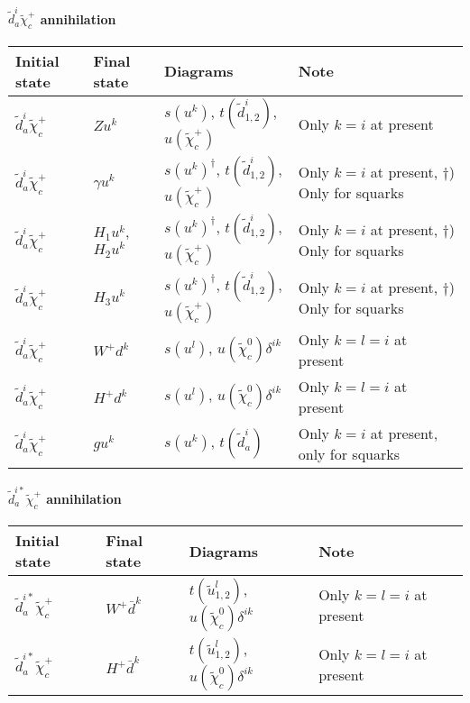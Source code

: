\paragraph{$\tilde{d}^{i}_{a} \tilde{\chi}_{c}^{+}$ annihilation}

\begin{center}
\begin{tabular}{llll} \hline
{\bfseries Initial state} & {\bfseries Final state} &
{\bfseries Diagrams} & {\bfseries Note} \\ \hline \tabspace
$\tilde{d}^{i}_a \tilde{\chi}_{c}^+$ & $Z u^k$ &
$s(u^k)$, $t(\tilde{d}^i_{1,2})$, $u(\tilde{\chi}_c^+)$
& Only $k=i$ at present \\
$\tilde{d}^{i}_a \tilde{\chi}_{c}^+$ & $\gamma u^k$ &
$s(u^k)^\dagger$, $t(\tilde{d}^i_{1,2})$, $u(\tilde{\chi}_c^+)$ 
& Only $k=i$ at present, $\dagger$) Only for squarks \\
$\tilde{d}^{i}_a \tilde{\chi}_{c}^+$ & $H_1 u^k$, $H_2 u^k$ &
$s(u^k)^\dagger$, $t(\tilde{d}^i_{1,2})$, $u(\tilde{\chi}_c^+)$ 
& Only $k=i$ at present, $\dagger$) Only for squarks \\
$\tilde{d}^{i}_a \tilde{\chi}_{c}^+$ & $H_3 u^k$ &
$s(u^k)^\dagger$, $t(\tilde{d}^i_{1,2})$, $u(\tilde{\chi}_c^+)$ 
& Only $k=i$ at present, $\dagger$) Only for squarks \\
$\tilde{d}^{i}_a \tilde{\chi}_{c}^+$ & $W^+ d^k$ &
$s(u^l)$, $u(\tilde{\chi}_c^0)\delta^{ik}$
& Only $k=l=i$ at present \\
$\tilde{d}^{i}_a \tilde{\chi}_{c}^+$ & $H^+ d^k$ &
$s(u^l)$, $u(\tilde{\chi}_c^0)\delta^{ik}$
& Only $k=l=i$ at present \\
$\tilde{d}^{i}_a \tilde{\chi}_{c}^+$ & $g u^k$ &
$s(u^k)$, $t(\tilde{d}_a^i)$
& Only $k=i$ at present, only for squarks \\ \hline
\end{tabular}
\end{center}

\paragraph{$\tilde{d}^{i*}_{a} \tilde{\chi}_{c}^{+}$ annihilation}

\begin{center}
\begin{tabular}{llll} \hline
{\bfseries Initial state} & {\bfseries Final state} &
{\bfseries Diagrams} & {\bfseries Note} \\ \hline \tabspace
$\tilde{d}^{i*}_a \tilde{\chi}_{c}^+$ & $W^+ \bar{d}^k$ &
$t(\tilde{u}^l_{1,2})$, $u(\tilde{\chi}_c^0)\delta^{ik}$ 
& Only $k=l=i$ at present \\
$\tilde{d}^{i*}_a \tilde{\chi}_{c}^+$ & $H^+ \bar{d}^k$ &
$t(\tilde{u}^l_{1,2})$, $u(\tilde{\chi}_c^0)\delta^{ik}$
& Only $k=l=i$ at present \\ \hline
\end{tabular}
\end{center}


